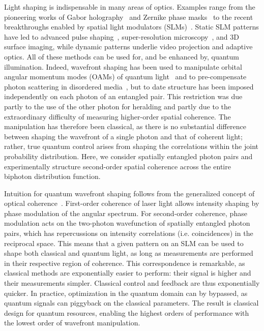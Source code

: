 \documentclass[%
 reprint,
 amsmath,amssymb,
 aps
]{revtex4-1}
\begin{document}
Light shaping is indispensable in many areas of optics. Examples range from the pioneering works of Gabor holography~\cite{gabor_new_1948} and Zernike phase masks~\cite{zernike_how_1955} to the recent breakthroughs enabled by spatial light modulators (SLMs)~\cite{yeh_optics_2009}. Static SLM patterns have led to advanced pulse shaping~\cite{weiner_femtosecond_2000}, super-resolution microscopy~\cite{klar_fluorescence_2000}, and 3D surface imaging, while dynamic patterns underlie video projection and adaptive optics. All of these methods can be used for, and be enhanced by, quantum illumination. Indeed, wavefront shaping has been used to manipulate orbital angular momentum modes (OAMs) of quantum light~\cite{leach_quantum_2010,fickler_quantum_2012} and to pre-compensate photon scattering in disordered media~\cite{defienne_two-photon_2016,wolterink_programmable_2016}, but to date structure has been imposed independently on each photon of an entangled pair. This restriction was due partly to the use of the other photon for heralding and partly due to the extraordinary difficulty of measuring higher-order spatial coherence. The manipulation has therefore been classical, as there is no substantial difference between shaping the wavefront of a single photon and that of coherent light; rather, true quantum control arises from shaping the correlations within the joint probability distribution. Here, we consider spatially entangled photon pairs and experimentally structure second-order spatial coherence across the entire biphoton distribution function. 

Intuition for quantum wavefront shaping follows from the generalized concept of optical coherence~\cite{glauber_quantum_1963}. First-order coherence of laser light allows intensity shaping by phase modulation of the angular spectrum. For second-order coherence, phase modulation acts on the two-photon wavefunction of spatially entangled photon pairs, which has repercussions on intensity correlations (i.e. coincidences) in the reciprocal space. This means that a given pattern on an SLM can be used to shape both classical and quantum light, as long as measurements are performed in their respective region of coherence. This correspondence is remarkable, as classical methods are exponentially easier to perform: their signal is higher and their measurements simpler. Classical control and feedback are thus exponentially quicker. In practice, optimization in the quantum domain can by bypassed, as quantum signals can piggyback on the classical parameters. The result is classical design for quantum resources, enabling the highest orders of performance with the lowest order of wavefront manipulation.
\end{document}
